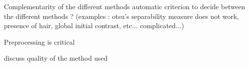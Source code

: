 \documentclass[a4paper,10pt]{article}
\begin{document}
 Complementarity of the different methods
 automatic criterion to decide between the different methods ? (examples : otsu's separability measure does not work, presence of hair, global initial contrast, etc... complicated...)
 
 Preprocessing is critical
 
discuss quality of the method used





\end{document}
